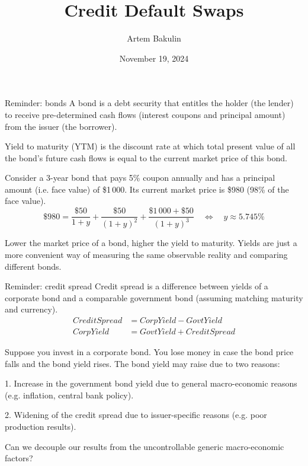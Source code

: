 \documentclass{beamer}
\title{Credit Default Swaps}
\author{Artem Bakulin}
\date{November 19, 2024}
\newcommand{\inserttitleframe}{
		\begin{frame}
		\titlepage
		\end{frame}
	}
\begin{document}
\inserttitleframe

\begin{frame}{Reminder: bonds}
\justify
A \alert{bond} is a debt security that entitles the holder (the lender) to receive pre-determined cash flows (interest coupons and principal amount) from the issuer (the borrower).

\justify
\alert{Yield to maturity (YTM)} is the discount rate at which total present value of all the bond's future cash flows is equal to the current market price of this bond.

\justify
Consider a 3-year bond that pays 5\% coupon annually and has a principal amount (i.e. face value) of \$1\,000. Its current market price is \$980 (98\% of the face value).
\begin{equation*}
\$980 = \frac{\$50}{1+y} + \frac{\$50}{(1+y)^2} + \frac{\$1\,000 + \$50}{(1+y)^3}  \quad  \Leftrightarrow \quad y \approx 5.745\%
\end{equation*}

\justify
Lower the market price of a bond, higher the yield to maturity. Yields are just a more convenient way of measuring the same observable reality and comparing different bonds.
\end{frame}



\begin{frame}{Reminder: credit spread}
\justify
\alert{Credit spread} is a difference between yields of a corporate bond and a comparable government bond (assuming matching maturity and currency).
\begin{align*}
CreditSpread &= CorpYield - GovtYield \\
 CorpYield &= GovtYield + CreditSpread
\end{align*}

\justify
Suppose you invest in a corporate bond. You lose money in case the bond price falls and the bond yield rises. The bond yield may raise due to two reasons:

1. Increase in the government bond yield due to general macro-economic reasons (e.g. inflation, central bank policy).

2. Widening of the credit spread due to issuer-specific reasons (e.g. poor production results).

\justify
Can we decouple our results from the uncontrollable generic macro-economic factors? 
\end{frame}
\end{document}
